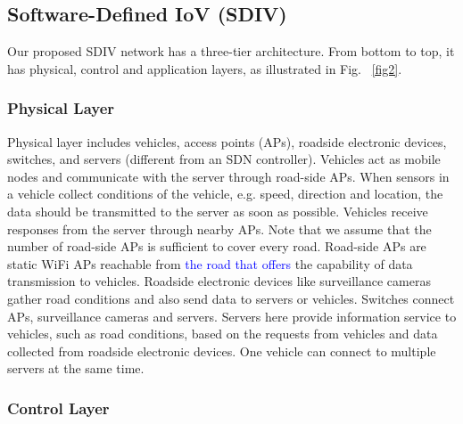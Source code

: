 \documentclass[journal]{IEEEtran}
\begin{document}
\subsection{Software-Defined IoV (SDIV)} \label{SDIV}

Our proposed SDIV network has a three-tier architecture. From bottom to top, it has physical, control and application layers, as illustrated in Fig. ~\ref{fig2}.

\subsubsection{Physical Layer}

Physical layer includes vehicles, access points (APs), roadside electronic devices, switches, and servers (different from an SDN controller). Vehicles act as mobile nodes and communicate with the server through road-side APs. When sensors in a vehicle collect conditions of the vehicle, e.g. speed, direction and location, the data should be transmitted to the server as soon as possible. Vehicles receive responses from the server through nearby APs. Note that we assume that the number of road-side APs is sufficient to cover every road. Road-side APs are static WiFi APs reachable from \textcolor{blue}{the road that offers} the capability of data transmission to vehicles. Roadside electronic devices like surveillance cameras gather road conditions and also send data to servers or vehicles. Switches connect APs, surveillance cameras and servers. Servers here provide information service to vehicles, such as road conditions, based on the requests from vehicles and data collected from roadside electronic devices. One vehicle can connect to multiple servers at the same time.

\subsubsection{Control Layer}
\end{document}
